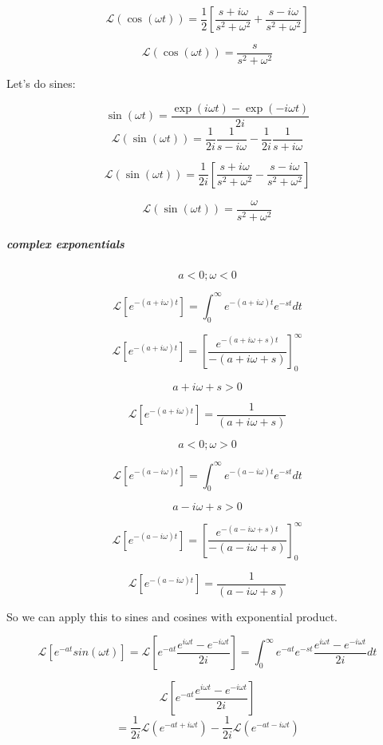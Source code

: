 \documentclass[17pt]{extarticle}
\begin{document}
$$\mathcal{L}(\cos (\omega t)) =\frac{1}{2} \left[ \frac{s+i \omega}{s^2 +  \omega^2 } + \frac{s- i \omega}{s^2 +  \omega^2} \right]$$

$$\mathcal{L}(\cos (\omega t)) = \frac{s}{s^2 +  \omega^2} $$

Let's do sines:

$$\sin (\omega t) = \frac{\exp (i \omega t) - \exp (- i \omega t)}{2i}$$
$$\mathcal{L}(\sin (\omega t)) =\frac{1}{2i} \frac{1}{s- i \omega } - \frac{1}{2i} \frac{1}{s+i \omega}$$


$$\mathcal{L}(\sin (\omega t)) =\frac{1}{2i} \left[ \frac{s+i \omega}{s^2 +  \omega^2 } - \frac{s- i \omega}{s^2 +  \omega^2} \right]$$

$$\mathcal{L}(\sin (\omega t)) = \frac{\omega}{s^2 +  \omega^2} $$

\subparagraph{complex exponentials}

$$a< 0 ; \omega <0$$

$$\mathcal{L} \left[ e^{-(a+i\omega) t} \right] = \int_0^\infty e^{-(a+i\omega) t} e^{-st} dt$$


$$\mathcal{L} \left[ e^{-(a+i\omega) t} \right] = \left[ \frac{e^{-(a+i \omega+s)t}}{-(a+ i \omega+s)}\right]_0^\infty$$

$$a+i \omega  +s >0 $$

$$\mathcal{L} \left[ e^{-(a+i\omega) t} \right] = \frac{1}{(a+ i \omega+s)}$$

$$a< 0 ; \omega > 0$$

$$\mathcal{L} \left[ e^{-(a-i\omega) t} \right] = \int_0^\infty e^{-(a-i\omega) t} e^{-st} dt$$

$$a-i \omega  + s >0 $$

$$\mathcal{L} \left[ e^{-(a-i\omega) t} \right] =  \left[ \frac{e^{-(a-i \omega+s)t}}{-(a- i \omega+s)}\right]_0^\infty$$

$$\mathcal{L} \left[ e^{-(a-i\omega) t} \right] =   \frac{1}{(a- i \omega+s)}$$

So we can apply this to sines and cosines with exponential product.

$$\mathcal{L} \left[ e^{-a t}  sin (\omega t) \right] = \mathcal{L} \left[ e^{-a t}  \frac{e^{i\omega t} -e^{-i\omega t}}{2i} \right]  = \int_0^\infty e^{-a t} e^{-st} \frac{e^{i\omega t} -e^{-i\omega t}}{2i} dt$$


$$\mathcal{L} \left[ e^{-a t}  \frac{e^{i\omega t} -e^{-i\omega t}}{2i} \right]$$
$$ = \frac{1}{2i} \mathcal{L} (e^{-at+i\omega t}) -\frac{1}{2i} \mathcal{L} (e^{-at-i\omega t}) $$
\end{document}
